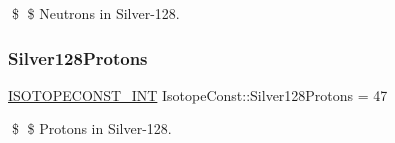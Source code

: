\$ \$ Neutrons in Silver-\/128. \mbox{\label{group___isotope_const-_silver-_ag128_ga1fe0d048c7348dab410afd0d6d084d26}} 
\subsubsection{\texorpdfstring{Silver128\+Protons}{Silver128Protons}}
{\footnotesize\ttfamily \mbox{\hyperlink{group___isotope_const-_macros_ga5f18360b3e99483a35c32d789e62621c}{I\+S\+O\+T\+O\+P\+E\+C\+O\+N\+S\+T\+\_\+\+I\+NT}} Isotope\+Const\+::\+Silver128\+Protons = 47}

\$ \$ Protons in Silver-\/128. 